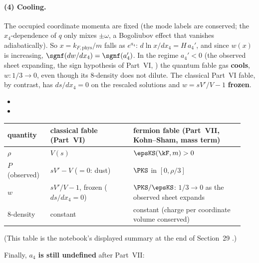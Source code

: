 \paragraph{(4) Cooling.} The occupied coordinate momenta are fixed (the mode labels are conserved;
the $x_4$-dependence of $q$ only mixes $\pm\omega$, a Bogoliubov effect that vanishes adiabatically).
So $x=k_{F,\mathrm{phys}}/m$ falls as $e^{a_4}$: $d\ln x/dx_4=H\,a_4'$, and since $w(x)$ is increasing,
$\sgnf(dw/dx_4)=\sgnf(a_4')$. In the regime $a_4'<0$ (the observed sheet expanding, the sign
hypothesis of Part~VI, ) the quantum fable gas \textbf{cools}, $w:1/3\to0$, even
though its 8-density does not dilute. The classical Part~VI fable, by contrast, has $ds/dx_4=0$ on the
rescaled solutions and $w=sV'/V-1$ \textbf{frozen}. 
\begin{itemize}
  \item {}
  \item {}
\end{itemize}

{\small
\begin{longtable}{@{}p{0.17\linewidth}p{0.33\linewidth}p{0.44\linewidth}@{}}
\toprule
\raggedright quantity & \raggedright classical fable (Part~VI) & \raggedright fermion fable (Part~VII, Kohn--Sham, mass term) \tabularnewline
\midrule
\endhead
\raggedright $\rho$ & \raggedright $V(s)$ & \raggedright $\epsKS(\kF,m)>0$ \tabularnewline
\raggedright $P$ (observed) & \raggedright $sV'-V$ ($=0$: dust) & \raggedright $\PKS$ in $[0,\rho/3]$ \tabularnewline
\raggedright $w$ & \raggedright $sV'/V-1$, frozen ($ds/dx_4=0$) & \raggedright $\PKS/\epsKS$: $1/3\to0$ as the observed sheet expands \tabularnewline
\raggedright 8-density & \raggedright constant & \raggedright constant (charge per coordinate volume conserved) \tabularnewline
\bottomrule
\end{longtable}
}
\noindent(This table is the notebook's displayed summary at the end of Section~29 .)

Finally, \textbf{$a_4$ is still undefined} after Part~VII: 

